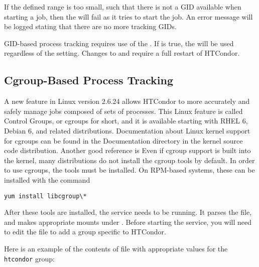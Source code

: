 If the defined range is too small, such that there is not a GID available
when starting a job,
then the  will fail as it tries to start the job.
An error message will be logged stating that there are no more tracking GIDs.

GID-based process tracking requires use of the . If
 is true, the  will
be used regardless of the  setting.  Changes to
 and  require
a full restart of HTCondor.

\subsection{\label{sec:CGroupTracking}Cgroup-Based Process Tracking} 

A new feature in Linux version 2.6.24 allows HTCondor to more accurately 
and safely manage jobs composed of sets of processes.  This Linux 
feature is called Control Groups, or cgroups for short, and it is 
available starting with RHEL 6, Debian 6, and related distributions.  
Documentation about Linux kernel support for cgroups can be found 
in the Documentation directory in the kernel source code distribution.
Another good reference is 
Even if cgroup support is built into the kernel, 
many distributions do not install the cgroup tools by default.
In order to use cgroups, the tools must be installed.  
On RPM-based systems, these can be installed with the command

\begin{verbatim}
yum install libcgroup\*
\end{verbatim}

After these tools are installed, the  service needs to be
running.  It parses the  file, and makes
appropriate mounts under .  Before starting the 
service, you will need to edit the file  to
add a group specific to HTCondor.

Here is an example of the contents of file  with
appropriate values for the \texttt{htcondor} group:

